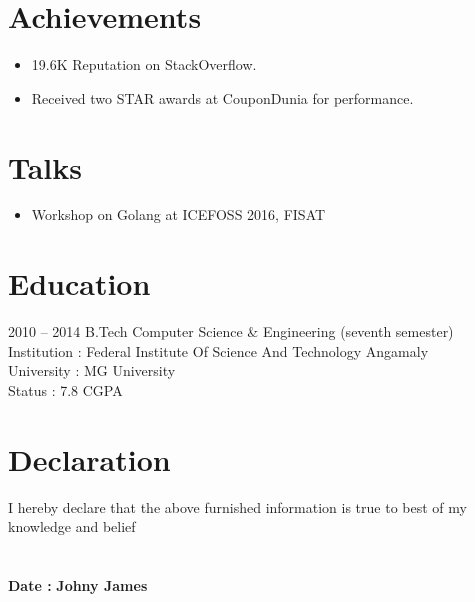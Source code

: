\documentclass[a4paper]{article}
\begin{document}
\section{Achievements}
\begin{itemize}
    \item 19.6K Reputation on StackOverflow.
    \item Received two STAR awards at CouponDunia for performance.
\end{itemize}

\section{Talks}
\begin{itemize}
    \item Workshop on Golang at ICEFOSS 2016, FISAT
\end{itemize}

\section{Education}
\begin{CV}
\item[2010 -- 2014] B.Tech Computer Science \& Engineering (seventh semester) \\
    Institution : Federal Institute Of Science And Technology Angamaly \\
    University : MG University \\
    Status : 7.8 CGPA 
\end{CV}

\section{Declaration}
I hereby declare that the above furnished information is true to best of my knowledge and belief \\ \\ \\
\vspace{5\baselineskip}
\textbf {Date :} \hfill \textbf{Johny James}
\end{document}
